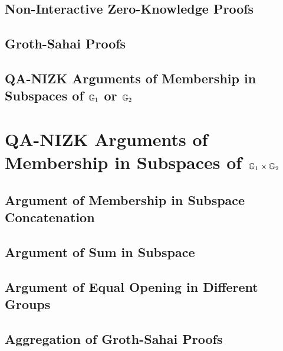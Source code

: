     \section{Non-Interactive Zero-Knowledge Proofs} \label{sec:zk}

        

    \section{Groth-Sahai Proofs}\label{sec:gs-proofs}

        

    \section{QA-NIZK Arguments of Membership in Subspaces of $\mathbb{G}_1$ or $\mathbb{G}_2$} \label{sect:QANIZKlinspace}

        

    
\chapter{QA-NIZK Arguments of Membership in Subspaces of $\mathbb{G}_1\times\mathbb{G}_2$}\label{sec:agg-asym}
    
    

    \section{Argument of Membership in Subspace Concatenation}\label{sec:concat}

        

    \section{Argument of Sum in Subspace}\label{sec:sum}
        
        

    \section{Argument of Equal Opening in Different Groups} \label{sec:aggcommit}

         

    \section{Aggregation of Groth-Sahai Proofs}\label{sec:agg-gs}

